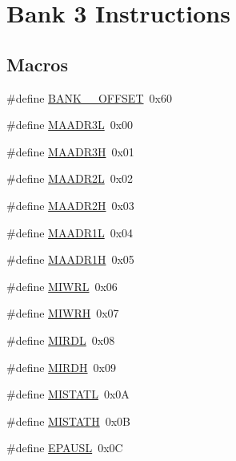 \hypertarget{group___b_a_n_k__3}{}\section{Bank 3 Instructions}
\label{group___b_a_n_k__3}
\subsection*{Macros}
\begin{DoxyCompactItemize}
\item 
\#define \mbox{\hyperlink{group___b_a_n_k__3_gafe3718fe6c607fc8c48e91ad5f2787b2}{B\+A\+N\+K\+\_\+\_\+\+O\+F\+F\+S\+ET}}~0x60
\item 
\#define \mbox{\hyperlink{group___b_a_n_k__3_ga562cebf48745071887d6b26b45613dee}{M\+A\+A\+D\+R3L}}~0x00
\item 
\#define \mbox{\hyperlink{group___b_a_n_k__3_ga884595c6aa6c148e0171a0050276824e}{M\+A\+A\+D\+R3H}}~0x01
\item 
\#define \mbox{\hyperlink{group___b_a_n_k__3_gabbf10dd131373a62af7618061e59453a}{M\+A\+A\+D\+R2L}}~0x02
\item 
\#define \mbox{\hyperlink{group___b_a_n_k__3_ga6a76f6caa677dca24be4c9f25fe9bfa1}{M\+A\+A\+D\+R2H}}~0x03
\item 
\#define \mbox{\hyperlink{group___b_a_n_k__3_ga92536e8fcb2cb2170a2a83d84c0b6a64}{M\+A\+A\+D\+R1L}}~0x04
\item 
\#define \mbox{\hyperlink{group___b_a_n_k__3_gab82d99240b106514c2910228a1d3a963}{M\+A\+A\+D\+R1H}}~0x05
\item 
\#define \mbox{\hyperlink{group___b_a_n_k__3_ga18aba35be6189e6150a9b4e2c2c29b69}{M\+I\+W\+RL}}~0x06
\item 
\#define \mbox{\hyperlink{group___b_a_n_k__3_gaf5d129bad4e0df51b5a2f9f7ee0f2da4}{M\+I\+W\+RH}}~0x07
\item 
\#define \mbox{\hyperlink{group___b_a_n_k__3_gadc002e2f058cbc1cf556b4a33d0c401c}{M\+I\+R\+DL}}~0x08
\item 
\#define \mbox{\hyperlink{group___b_a_n_k__3_gab2316c2a713dc20c6d0f892faa5c618b}{M\+I\+R\+DH}}~0x09
\item 
\#define \mbox{\hyperlink{group___b_a_n_k__3_gab9f1d60bc0d6cb57745ec753a86a45a1}{M\+I\+S\+T\+A\+TL}}~0x0A
\item 
\#define \mbox{\hyperlink{group___b_a_n_k__3_ga120d7cc90087143d96af4dcd1b3e608f}{M\+I\+S\+T\+A\+TH}}~0x0B
\item 
\#define \mbox{\hyperlink{group___b_a_n_k__3_gac1388dff78c23a31ec55335d727207e9}{E\+P\+A\+U\+SL}}~0x0C

\end{DoxyCompactItemize}
